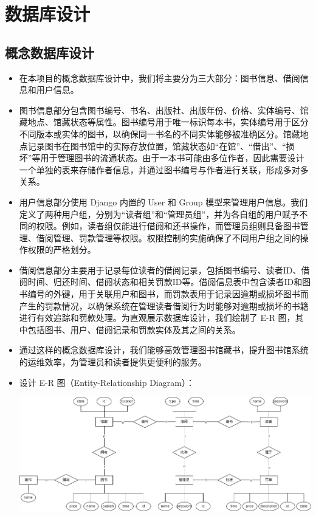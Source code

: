 \documentclass[a4paper,14pt]{article}
\begin{document}
\section{数据库设计}

\subsection{概念数据库设计}
\begin{itemize}
    \item 在本项目的概念数据库设计中，我们将主要分为三大部分：图书信息、借阅信息和用户信息。
    \item 图书信息部分包含图书编号、书名、出版社、出版年份、价格、实体编号、馆藏地点、馆藏状态等属性。图书编号用于唯一标识每本书，实体编号用于区分不同版本或实体的图书，以确保同一书名的不同实体能够被准确区分。馆藏地点记录图书在图书馆中的实际存放位置，馆藏状态如“在馆”、“借出”、“损坏”等用于管理图书的流通状态。由于一本书可能由多位作者，因此需要设计一个单独的表来存储作者信息，并通过图书编号与作者进行关联，形成多对多关系。
    \item 用户信息部分使用 Django 内置的 User 和 Group 模型来管理用户信息。我们定义了两种用户组，分别为“读者组”和“管理员组”，并为各自组的用户赋予不同的权限。例如，读者组仅能进行借阅和还书操作，而管理员组则具备图书管理、借阅管理、罚款管理等权限。权限控制的实施确保了不同用户组之间的操作权限的严格划分。
    \item 借阅信息部分主要用于记录每位读者的借阅记录，包括图书编号、读者ID、借阅时间、归还时间、借阅状态和相关罚款ID等。借阅信息表中包含读者ID和图书编号的外键，用于关联用户和图书，而罚款表用于记录因逾期或损坏图书而产生的罚款情况，以确保系统在管理读者借阅行为时能够对逾期或损坏的书籍进行有效追踪和罚款处理。为直观展示数据库设计，我们绘制了 E-R 图，其中包括图书、用户、借阅记录和罚款实体及其之间的关系。
    \item 通过这样的概念数据库设计，我们能够高效管理图书馆藏书，提升图书馆系统的运维效率，为管理员和读者提供更便利的服务。
    \item 设计 E-R 图（Entity-Relationship Diagram）：

    \vspace{10pt}
\begin{center}
    \includegraphics[width=\linewidth]{images/ERphoto.png}\end{center}
\vspace{5pt}



\end{itemize}
\end{document}
